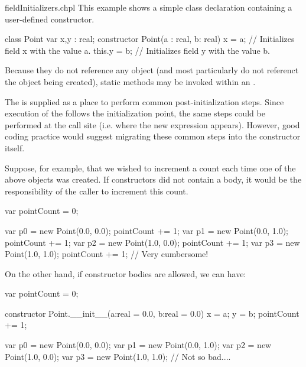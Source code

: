 \begin{chapelexample}{fieldInitializers.chpl}
This example shows a simple class declaration containing a user-defined constructor.
\begin{chapel}
class Point { 
  var x,y : real; 
  constructor Point(a : real, b: real)
  { x = a; 			// Initializes field x with the value a.
    this.y = b;     // Initializes field y with the value b.
  }
  {}
}
\end{chapel}
\end{chapelexample}
\noindent
Because they do not reference any object (and most particularly do not referenct
the object being created), static methods may be
invoked within an .

\begin{rationale}
The  is supplied as a place to perform common
post-initialization steps.  Since execution of the 
follows the initialization point, the same steps could be performed at the call
site (i.e. where the new expression appears).  However, good coding practice
would suggest migrating these common steps into the constructor itself.

Suppose, for example, that we wished to increment a count each time one
of the above  objects was created.  If constructors did not contain
a body, it would be the responsibility of the caller to increment this count.
\begin{chapel}
var pointCount = 0;

var p0 = new Point(0.0, 0.0);
pointCount += 1;
var p1 = new Point(0.0, 1.0);
pointCount += 1;
var p2 = new Point(1.0, 0.0);
pointCount += 1;
var p3 = new Point(1.0, 1.0);
pointCount += 1;
// Very cumbersome!
\end{chapel}

On the other hand, if constructor bodies are allowed, we can have:
\begin{chapel}
var pointCount = 0;

constructor Point.__init__(a:real = 0.0, b:real = 0.0)
{ x = a; y = b; }
{ pointCount += 1; }

var p0 = new Point(0.0, 0.0);
var p1 = new Point(0.0, 1.0);
var p2 = new Point(1.0, 0.0);
var p3 = new Point(1.0, 1.0);
// Not so bad....
\end{chapel}
\end{rationale}

